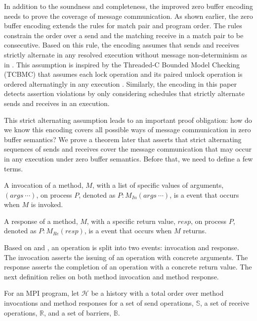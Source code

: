 In addition to the soundness and completeness, the improved zero buffer encoding needs to prove the coverage of message communication. As shown earlier, the zero buffer encoding extends the rules for match pair and program order. The rules constrain the order over a send and the matching receive in a match pair to be consecutive. Based on this rule, the encoding assumes that sends and receives strictly alternate in any resolved execution without message non-determinism as in . This assumption is inspired by the Threaded-C Bounded Model Checking (TCBMC) that assumes each lock operation and its paired unlock operation is ordered alternatingly in any execution \cite{DBLP:conf/cav/RabinovitzG05}. Similarly, the encoding in this paper detects assertion violations by only considering schedules that strictly alternate sends and receives in an execution. 

This strict alternating assumption leads to an important proof obligation: how do we know this encoding covers all possible ways of message communication in zero buffer semantics? We prove a theorem later that asserts that strict alternating sequences of sends and receives cover the message communication that may occur in any execution under zero buffer semantics. Before that, we need to define a few terms.

\begin{definition}\label{def:invocation}
A invocation of a method, $M$, with a list of specific values of arguments, $(args\ \cdots)$, on process $P$, denoted as $P:M_\mathit{In}(args\ \cdots)$, is a event that occurs when $M$ is invoked. 
\end{definition}

\begin{definition}\label{def:response}
A response of a method, $M$, with a specific return value, $resp$, on process $P$, denoted as $P:M_\mathit{Re}(resp)$, is a event that occurs when $M$ returns. 
\end{definition}

Based on  and , an operation is split into two events: invocation and response. The invocation asserts the issuing of an operation with concrete arguments. The response asserts the completion of an operation with a concrete return value. The next definition relies on both method invocation and method response. 

\begin{definition}[History]\label{def:history}
For an MPI program, let $\mathcal{H}$ be a history with a total order over method invocations and method responses for a set of send operations, $\mathbb{S}$, a set of receive operations, $\mathbb{R}$, and a set of barriers, $\mathbb{B}$.
\end{definition}

